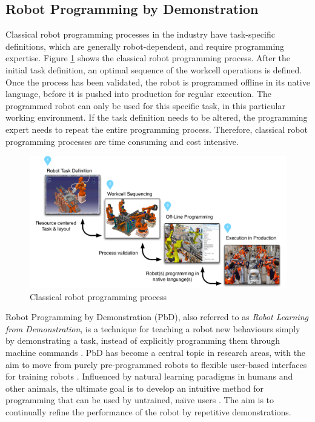 \subsection{Robot Programming by Demonstration}
Classical robot programming processes in the industry have task-specific definitions, which are generally robot-dependent, and require programming expertise.
Figure \ref{fig:Classical robot programming process} shows the classical robot programming process.
After the initial task definition, an optimal sequence of the workcell operations is defined.
Once the process has been validated, the robot is programmed offline in its native language, before it is pushed into production for regular execution.
The programmed robot can only be used for this specific task, in this particular working environment.
If the task definition needs to be altered, the programming expert needs to repeat the entire programming process.
Therefore, classical robot programming processes are time consuming and cost intensive.

  \begin{figure}[ht]
    \centering
    \includegraphics[scale=0.4]{figures/manual-programming}
    \caption{Classical robot programming process}
    \label{fig:Classical robot programming process}
  \end{figure}

Robot Programming by Demonstration (PbD), also referred to as \textit{Robot Learning from Demonstration}, is a technique for teaching a robot new behaviours simply by demonstrating a task, instead of explicitly programming them through machine commands \cite{ghallab2004automated}.
PbD has become a central topic in research areas, with the aim to move from purely pre-programmed robots to flexible user-based interfaces for training robots \cite{billard2008robot}.
Influenced by natural learning paradigms in humans and other animals, the ultimate goal is to develop an intuitive method for programming that can be used by untrained, na\"{\i}ve users \cite{suay2012practical}.
The aim is to continually refine the performance of the robot by repetitive demonstrations.



